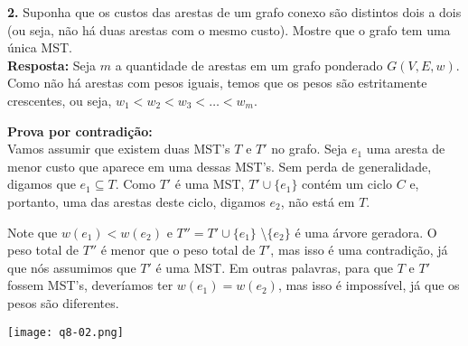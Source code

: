 
\noindent\textbf{2.} Suponha que os custos das arestas de um grafo conexo são distintos dois a dois (ou seja, não há duas arestas com o mesmo custo). Mostre que o grafo tem uma única MST.\\[6pt]
\textbf{Resposta:} Seja $m$ a quantidade de arestas em um grafo ponderado $G(V, E, w)$. Como não há arestas com pesos iguais, temos que os pesos são estritamente crescentes, ou seja, $w_1 < w_2 < w_3 < \ldots < w_m$.

\textbf{Prova por contradição:}\\
Vamos assumir que existem duas MST's $T$ e $T'$ no grafo. Seja $e_1$ uma aresta de menor custo que aparece em uma dessas MST's. Sem perda de generalidade, digamos que $e_1 \subseteq T$. Como $T'$ é uma MST, $T' \cup \{e_1\}$ contém um ciclo $C$ e, portanto, uma das arestas deste ciclo, digamos $e_2$, não está em $T$.

Note que $w(e_1) < w(e_2)$ e $T'' = T' \cup \{e_1\}$ \textbackslash $\{e_2\}$ é uma árvore geradora. O peso total de $T''$ é menor que o peso total de $T'$, mas isso é uma contradição, já que nós assumimos que $T'$ é uma MST. Em outras palavras, para que $T$ e $T'$ fossem MST's, deveríamos ter $w(e_1) = w(e_2)$, mas isso é impossível, já que os pesos são diferentes.

\begin{center}
\texttt{[image: q8-02.png]}
\label{fig:8.2-1}
\end{center}